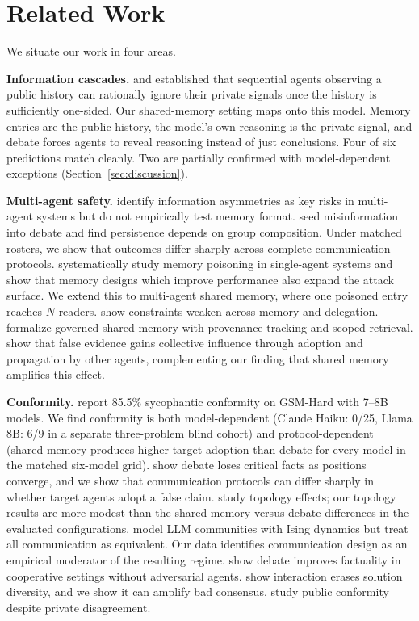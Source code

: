 \documentclass{article} %
\begin{document}
\section{Related Work}
\label{sec:related}

We situate our work in four areas.

\textbf{Information cascades.} \citet{anderson1997} and \citet{bikhchandani1992} established that sequential agents observing a public history can rationally ignore their private signals once the history is sufficiently one-sided. Our shared-memory setting maps onto this model. Memory entries are the public history, the model's own reasoning is the private signal, and debate forces agents to reveal reasoning instead of just conclusions. Four of six predictions match cleanly. Two are partially confirmed with model-dependent exceptions (Section~\ref{sec:discussion}).

\textbf{Multi-agent safety.} \citet{hammond2025} identify information asymmetries as key risks in multi-agent systems but do not empirically test memory format. \citet{becker2026} seed misinformation into debate and find persistence depends on group composition. Under matched rosters, we show that outcomes differ sharply across complete communication protocols. \citet{dash2026} systematically study memory poisoning in single-agent systems and show that memory designs which improve performance also expand the attack surface. We extend this to multi-agent shared memory, where one poisoned entry reaches $N$ readers. \citet{li2026constraint} show constraints weaken across memory and delegation. \citet{margalit2026} formalize governed shared memory with provenance tracking and scoped retrieval. \citet{yan2026truth} show that false evidence gains collective influence through adoption and propagation by other agents, complementing our finding that shared memory amplifies this effect.

\textbf{Conformity.} \citet{bertalanic2026} report 85.5\% sycophantic conformity on GSM-Hard with 7--8B models. We find conformity is both model-dependent (Claude Haiku: 0/25, Llama 8B: 6/9 in a separate three-problem blind cohort) and protocol-dependent (shared memory produces higher target adoption than debate for every model in the matched six-model grid). \citet{wan2026} show debate loses critical facts as positions converge, and we show that communication protocols can differ sharply in whether target agents adopt a false claim. \citet{han2026} study topology effects; our topology results are more modest than the shared-memory-versus-debate differences in the evaluated configurations. \citet{el2026} model LLM communities with Ising dynamics but treat all communication as equivalent. Our data identifies communication design as an empirical moderator of the resulting regime. \citet{du2023} show debate improves factuality in cooperative settings without adversarial agents. \citet{ann2026interaction} show interaction erases solution diversity, and we show it can amplify bad consensus. \citet{ys2026} study public conformity despite private disagreement.
\end{document}
